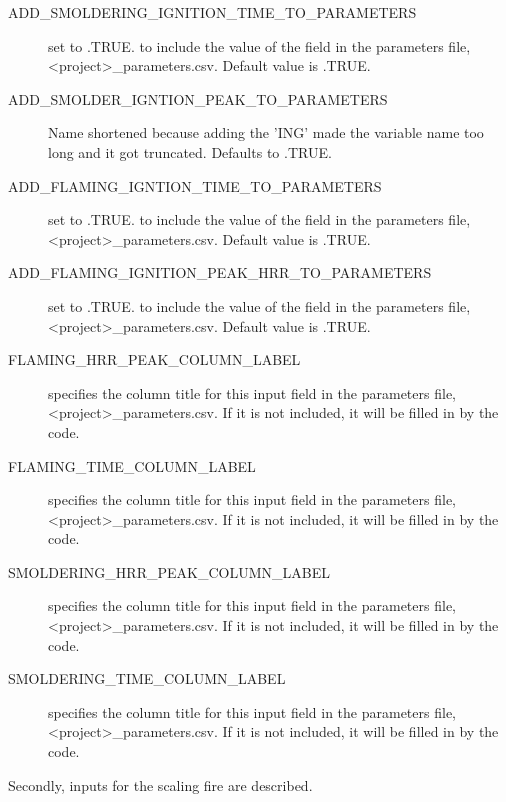 \documentclass[12pt,twoside]{book}
\begin{document}
\begin{description}
  \item[ADD\_SMOLDERING\_IGNITION\_TIME\_TO\_PARAMETERS] set to .TRUE. to include the value of the field in the parameters file, {\ct <project>\_parameters.csv}. Default value is .TRUE.
  \item[ADD\_SMOLDER\_IGNTION\_PEAK\_TO\_PARAMETERS] Name shortened because adding the 'ING' made the variable name too long and it got truncated. Defaults to {\ct .TRUE.}
  \item[ADD\_FLAMING\_IGNTION\_TIME\_TO\_PARAMETERS] set to .TRUE. to include the value of the field in the parameters file, {\ct <project>\_parameters.csv}. Default value is .TRUE.
  \item[ADD\_FLAMING\_IGNITION\_PEAK\_HRR\_TO\_PARAMETERS] set to .TRUE. to include the value of the field in the parameters file, {\ct <project>\_parameters.csv}. Default value is .TRUE.
  \item[FLAMING\_HRR\_PEAK\_COLUMN\_LABEL] specifies the column title for this input field in the parameters file, {\ct <project>\_parameters.csv}. If it is not included, it will be filled in by the code.
  \item[FLAMING\_TIME\_COLUMN\_LABEL] specifies the column title for this input field in the parameters file, {\ct <project>\_parameters.csv}. If it is not included, it will be filled in by the code.
  \item[SMOLDERING\_HRR\_PEAK\_COLUMN\_LABEL] specifies the column title for this input field in the parameters file, {\ct <project>\_parameters.csv}. If it is not included, it will be filled in by the code.
  \item[SMOLDERING\_TIME\_COLUMN\_LABEL] specifies the column title for this input field in the parameters file, {\ct <project>\_parameters.csv}. If it is not included, it will be filled in by the code.
 \end{description}
Secondly, inputs for the scaling fire are described.
\end{document}
